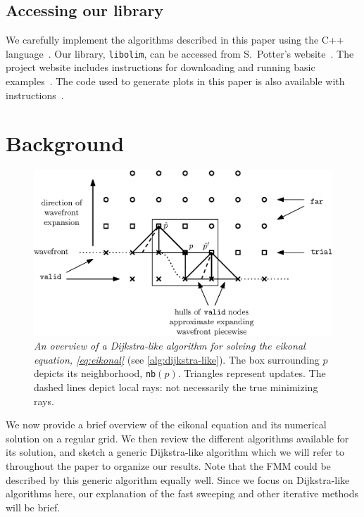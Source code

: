 \documentclass{article}
\begin{document}
\subsection{Accessing our library} We carefully implement the
algorithms described in this paper using the C++
language~\cite{stroustrup2013c++}. Our library, \texttt{libolim}, can
be accessed from S.\ Potter's website~\cite{sfp-umiacs-homepage}. The
project website includes instructions for downloading and running
basic examples~\cite{libolim-github}. The code used to generate plots
in this paper is also available with
instructions~\cite{libolim-github-plotting}.

\section{Background}\label{sec:background}

\begin{figure}[t]
  \centering
  \includegraphics[width=0.9\linewidth]{overview.eps}
  \caption{\emph{An overview of a Dijkstra-like algorithm for solving
      the eikonal equation, \cref{eq:eikonal}} (see
    \cref{alg:dijkstra-like}). The box surrounding $p$ depicts its
    neighborhood, \texttt{nb}$(p)$. Triangles represent updates. The
    dashed lines depict local rays: not necessarily the true
    minimizing rays.}
  \label{fig:overview}
\end{figure}

We now provide a brief overview of the eikonal equation and its
numerical solution on a regular grid. We then review the different
algorithms available for its solution, and sketch a generic
Dijkstra-like algorithm which we will refer to throughout the paper to
organize our results. Note that the FMM could be described by this
generic algorithm equally well. Since we focus on Dijkstra-like
algorithms here, our explanation of the fast sweeping and other
iterative methods will be brief.
\end{document}
